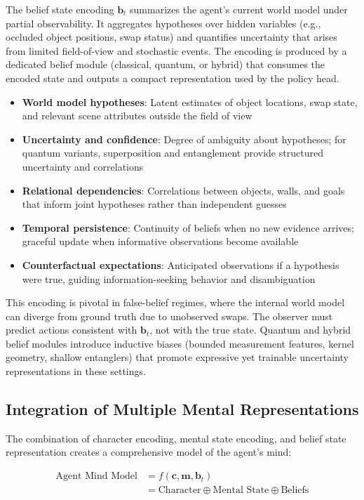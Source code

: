 \documentclass[11pt]{article}
\begin{document}
The belief state encoding $\mathbf{b}_t$ summarizes the agent's current world model under partial observability. It aggregates hypotheses over hidden variables (e.g., occluded object positions, swap status) and quantifies uncertainty that arises from limited field-of-view and stochastic events. The encoding is produced by a dedicated belief module (classical, quantum, or hybrid) that consumes the encoded state and outputs a compact representation used by the policy head.

\begin{itemize}
    \item \textbf{World model hypotheses}: Latent estimates of object locations, swap state, and relevant scene attributes outside the field of view
    \item \textbf{Uncertainty and confidence}: Degree of ambiguity about hypotheses; for quantum variants, superposition and entanglement provide structured uncertainty and correlations
    \item \textbf{Relational dependencies}: Correlations between objects, walls, and goals that inform joint hypotheses rather than independent guesses
    \item \textbf{Temporal persistence}: Continuity of beliefs when no new evidence arrives; graceful update when informative observations become available
    \item \textbf{Counterfactual expectations}: Anticipated observations if a hypothesis were true, guiding information-seeking behavior and disambiguation
\end{itemize}

This encoding is pivotal in false-belief regimes, where the internal world model can diverge from ground truth due to unobserved swaps. The observer must predict actions consistent with $\mathbf{b}_t$, not with the true state. Quantum and hybrid belief modules introduce inductive biases (bounded measurement features, kernel geometry, shallow entanglers) that promote expressive yet trainable uncertainty representations in these settings.

\subsection{Integration of Multiple Mental Representations}

The combination of character encoding, mental state encoding, and belief state representation creates a comprehensive model of the agent's mind:

\begin{align}
    \text{Agent Mind Model} &= f(\mathbf{c}, \mathbf{m}, \mathbf{b}_t) \\
    &= \text{Character} \oplus \text{Mental State} \oplus \text{Beliefs}
\end{align}
\end{document}
